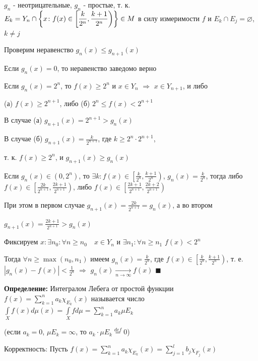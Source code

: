 \documentclass[a4paper]{report}
\newcommand*{\hm}[1]{#1\nobreak\discretionary{}%
            {\hbox{$\mathsurround=0pt #1$}}{}}
\begin{document}
\noindent
$g_n$ - неотрицательные, $g_n$ - простые, т. к. $E_k=Y_n\cap\biggl\{x\colon f(x)\in\left[\displaystyle\frac{k}{2^n},\displaystyle\frac{k+1}{2^n}\right)\biggr\}\hm\in M$ в силу измеримости $f$ и $E_k\cap E_j=\varnothing$, $k\ne j$

Проверим неравенство $g_n(x)\le g_{n+1}(x)$

Если $g_n(x)=0$, то неравенство заведомо верно

Если $g_n(x)=2^n$, то $f(x)\ge2^n$ и $x\in Y_n$ $\Rightarrow$ $x\in Y_{n+1}$, и либо 

(а) $f(x)\ge2^{n+1}$, либо (б) $2^n\le f(x)<2^{n+1}$

В случае (а) $g_{n+1}(x)=2^{n+1}>g_n(x)$

В случае (б) $g_{n+1}(x)=\displaystyle\frac{k}{2^{n+1}}$, где $k\ge2^n\cdot2^{n+1}$, 

т. к. $f(x)\ge2^n$, и $g_{n+1}(x)\ge g_n(x)$

Если $g_n(x)\in(0,2^n)$, то $\exists k\colon f(x)\in\left[\displaystyle\frac{k}{2^n},\displaystyle\frac{k+1}{2^n}\right)$, $g_n(x)=\displaystyle\frac{k}{2^n}$, тогда либо $f(x)\in\left[\displaystyle\frac{2k}{2^{n+1}},\displaystyle\frac{2k+1}{2^{n+1}}\right)$, либо $f(x)\in\left[\displaystyle\frac{2k+1}{2^{n+1}},\displaystyle\frac{2k+2}{2^{n+1}}\right)$

При этом в первом случае $g_{n+1}(x)=\displaystyle\frac{2k}{2^{n+1}}=g_n(x)$, а во втором 

$g_{n+1}(x)=\displaystyle\frac{2k+1}{2^{n+1}}>g_n(x)$

Фиксируем $x\colon\exists n_0\colon\forall n\ge n_0\quad x\in Y_n$ и $\exists n_1\colon\forall n\ge n_1$ $f(x)<2^n$

Тогда $\forall n\ge\max(n_0,n_1)$ имеем $g_n(x)=\displaystyle\frac{k}{2^n}$, где $f(x)\in\left[\displaystyle\frac{k}{2^n},\displaystyle\frac{k+1}{2^n}\right)$, т. е. $|g_n(x)-f(x)|<\displaystyle\frac{1}{2^n}$ $\Rightarrow$ $g_n
(x)\xrightarrow[n\to\infty]{}f(x)$ $\blacksquare$
\bigskip

\noindent\textbf{Определение:} Интегралом Лебега от простой функции $f(x)=\sum\limits_{k=1}^n a_k\chi_{E_k}(x)$ называется число $\displaystyle\int\limits_X f(x)d\mu(x)=\displaystyle\int\limits_X fd\mu=\sum\limits_{k=1}^n a_k\mu E_k$ 

(если $a_k=0$, $\mu E_k=\infty$, то $a_k\cdot\mu E_k\stackrel{def}{=}0$)

Корректность: Пусть $f(x)=\sum\limits_{k=1}^n a_k\chi_{E_k}(x)=\sum\limits_{j=1}^l b_j\chi_{F_j}(x)$
\end{document}
